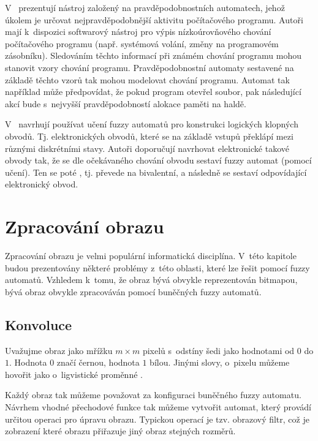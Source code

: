 V~\cite{Maz+-ProTreAutAppBehMod} prezentují nástroj založený na pravděpodobnostních automatech, jehož úkolem je určovat nejpravděpodobnější aktivitu počítačového programu. Autoři mají k~dispozici softwarový nástroj pro výpis nízkoúrovňového chování počítačového programu (např. systémová volání, změny na programovém zásobníku). Sledováním těchto informací při známém chování programu mohou stanovit vzory chování programu. Pravděpodobnostní automaty sestavené na základě těchto vzorů tak mohou modelovat chování programu. Automat tak například může předpovídat, že pokud program otevřel soubor, pak následující akcí bude s~nejvyšší pravděpodobností alokace paměti na haldě.

V~\cite{PedGac-LeaFuzzAut} navrhují používat učení fuzzy automatů pro konstrukci logických klopných obvodů. Tj. elektronických obvodů, které se na základě vstupů překlápí mezi různými diskrétními stavy. Autoři doporučují navrhovat elektronické takové obvody tak, že se dle očekávaného chování obvodu sestaví fuzzy automat (pomocí učení). Ten se poté , tj. převede na bivalentní, a následně se sestaví odpovídající elektronický obvod.

\section{Zpracování obrazu} \label{cha:ImgProc}
Zpracování obrazu je velmi populární informatická disciplína. V~této kapitole budou prezentovány některé problémy z~této oblasti, které lze řešit pomocí fuzzy automatů. Vzhledem k~tomu, že obraz bývá obvykle reprezentován bitmapou, bývá obraz obvykle zpracováván pomocí buněčných fuzzy automatů.

\subsection{Konvoluce} \label{subs:Convol}
Uvažujme obraz jako mřížku $m \times m$ pixelů s~odstíny šedi jako hodnotami od $0$ do $1$. Hodnota $0$ značí černou, hodnota $1$ bílou. Jinými slovy, o~pixelu můžeme hovořit jako o~ligvistické proměnné .

Každý obraz tak můžeme považovat za konfiguraci buněčného fuzzy automatu. Návrhem vhodné přechodové funkce tak můžeme vytvořit automat, který provádí určitou operaci pro úpravu obrazu. Typickou operací je tzv. obrazový filtr, což je zobrazení které obrazu přiřazuje jiný obraz stejných rozměrů.

